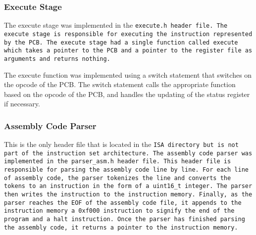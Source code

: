 \documentclass[a4paper,12pt]{article}
\begin{document}
		\subsubsection{Execute Stage}
			\par{
				The execute stage was implemented in the \tt{execute.h} header file.
				The execute stage is responsible for executing the instruction
				represented by the PCB. The execute stage had a single function
				called \tt{execute} which takes a pointer to the PCB and a pointer
				to the register file as arguments and returns nothing.
			}
			\par{
				The execute function was implemented using a switch statement that
				switches on the opcode of the PCB. The switch statement calls the
				appropriate function based on the opcode of the PCB, and handles
				the updating of the status register if necessary.
			}

		\subsubsection{Assembly Code Parser}
			\par{
				This is the only header file that is located in the \tt{ISA}
				directory but is not part of the instruction set architecture.
				The assembly code parser was implemented in the \tt{parser\_asm.h}
				header file. This header file is responsible for parsing the
				assembly code line by line. For each line of assembly code, the
				parser tokenizes the line and converts the tokens to an instruction
				in the form of a \tt{uint16\_t} integer. The parser then writes the
				instruction to the instruction memory. Finally, as the parser reaches
				the \tt{EOF} of the assembly code file, it appends to the instruction
				memory a \tt{0xf000} instruction to signify the end of the program and
				a halt instruction. Once the parser has finished parsing the assembly
				code, it returns a pointer to the instruction memory.
			}
	
\end{document}
